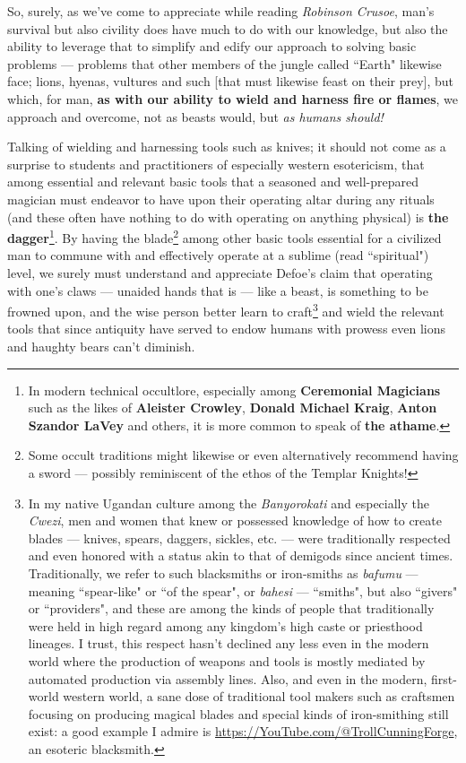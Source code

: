 \documentclass[a4paper]{article}
\begin{document}
So, surely, as we've come to appreciate while reading \textit{Robinson Crusoe}, man's survival but also civility does have much to do with our knowledge, but also the ability to leverage that to simplify and edify our approach to solving basic problems --- problems that other members of the jungle called ``Earth" likewise face; lions, hyenas, vultures and such [that must likewise feast on their prey], but which, for man, \textbf{as with our ability to wield and harness fire or flames}, we approach and overcome, not as beasts would, but \textit{as humans should!}

Talking of wielding and harnessing tools such as knives; it should not come as a surprise to students and practitioners of especially western esotericism, that among essential and relevant basic tools that a seasoned and well-prepared magician must endeavor to have upon their operating altar during any rituals (and these often have nothing to do with operating on anything physical) is \textbf{the dagger}\footnote{In modern technical occultlore, especially among \textbf{Ceremonial Magicians} such as the likes of \textbf{Aleister Crowley}, \textbf{Donald Michael Kraig}, \textbf{Anton Szandor LaVey} and others, it is more common to speak of \textbf{the athame}.}. By having the blade\footnote{Some occult traditions might likewise or even alternatively recommend having a sword --- possibly reminiscent of the ethos of the Templar Knights!} among other basic tools essential for a civilized man to commune with and effectively operate at a sublime (read ``spiritual") level, we surely must understand and appreciate Defoe's claim that operating with one's claws --- unaided hands that is --- like a beast, is something to be frowned upon, and the wise person better learn to craft\footnote{In my native Ugandan culture among the \textit{Banyorokati} and especially the \textit{Cwezi}, men and women that knew or possessed knowledge of how to create blades --- knives, spears, daggers, sickles, etc. --- were traditionally respected and even honored with a status akin to that of demigods since ancient times. Traditionally, we refer to such blacksmiths or iron-smiths as \textit{bafumu} --- meaning ``spear-like" or ``of the spear", or \textit{bahesi} --- ``smiths", but also ``givers" or ``providers", and these are among the kinds of people that traditionally were held in high regard among any kingdom's high caste or priesthood lineages. I trust, this respect hasn't declined any less even in the modern world where the production of weapons and tools is mostly mediated by automated production via assembly lines. Also, and even in the modern, first-world western world, a sane dose of traditional tool makers such as craftsmen focusing on producing magical blades and special kinds of iron-smithing still exist: a good example I admire is \url{https://YouTube.com/@TrollCunningForge}, an esoteric blacksmith.} and wield the relevant tools that since antiquity have served to endow humans with prowess even lions and haughty bears can't diminish.
\end{document}
